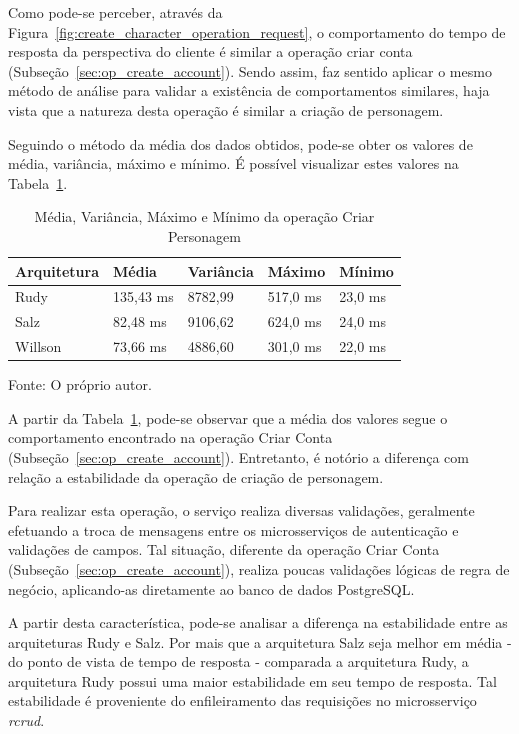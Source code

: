 Como pode-se perceber, através da Figura~\ref{fig:create_character_operation_request}, o comportamento do tempo de resposta da perspectiva do cliente é similar a operação criar conta (Subseção~\ref{sec:op_create_account}).
%
Sendo assim, faz sentido aplicar o mesmo método de análise para validar a existência de comportamentos similares, haja vista que a natureza desta operação é similar a criação de personagem.

Seguindo o método da média dos dados obtidos, pode-se obter os valores de média, variância, máximo e mínimo.
%
É possível visualizar estes valores na Tabela~\ref{tab:create_character_operation_request}.

\begin{table}[htb!]
\centering
\begin{adjustbox}{max width=\textwidth}
\caption{Média, Variância, Máximo e Mínimo da operação Criar Personagem}
\label{tab:create_character_operation_request}
\begin{tabular}{l|l|l|l|l}
\hline \hline
Arquitetura & Média     & Variância & Máximo    & Mínimo  \\ \hline \hline
Rudy        & 135,43 ms & 8782,99 & 517,0 ms & 23,0 ms \\ \hline
Salz        & 82,48 ms & 9106,62  & 624,0 ms & 24,0 ms \\ \hline
Willson     & 73,66 ms & 4886,60  & 301,0 ms  & 22,0 ms \\ \hline \hline
\end{tabular}

\end{adjustbox}

Fonte: O próprio autor.
\end{table}

A partir da Tabela~\ref{tab:create_character_operation_request}, pode-se observar que a média dos valores segue o comportamento encontrado na operação Criar Conta (Subseção~\ref{sec:op_create_account}). 
%
Entretanto, é notório a diferença com relação a estabilidade da operação de criação de personagem.

Para realizar esta operação, o serviço realiza diversas validações, geralmente efetuando a troca de mensagens entre os microsserviços de autenticação e validações de campos.
%
Tal situação, diferente da operação Criar Conta (Subseção~\ref{sec:op_create_account}), realiza poucas validações lógicas de regra de negócio, aplicando-as diretamente ao banco de dados PostgreSQL.

A partir desta característica, pode-se analisar a diferença na estabilidade entre as arquiteturas Rudy e Salz.
%
Por mais que a arquitetura Salz seja melhor em média - do ponto de vista de tempo de resposta - comparada a arquitetura Rudy, a arquitetura Rudy possui uma maior estabilidade em seu tempo de resposta.
%
Tal estabilidade é proveniente do enfileiramento das requisições no microsserviço \textit{rcrud}.

